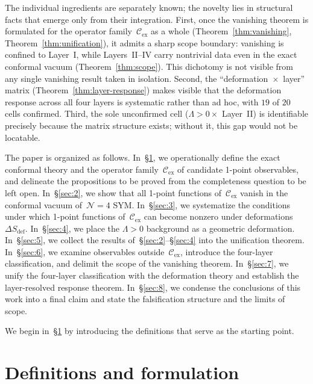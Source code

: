 \documentclass[
  aps,
  prd,
  preprint,
  groupedaddress,
  nofootinbib,
  longbibliography
]{revtex4-2}
\theoremstyle{remark}
\newcommand{\Cex}{\mathcal{C}_{\mathrm{ex}}}
\newcommand{\N}{\mathcal{N}}
\begin{document}
The individual ingredients are separately known;
the novelty lies in structural facts that emerge only from their
integration.
First, once the vanishing theorem is formulated for the operator
family~$\Cex$ as a whole
(Theorem~\ref{thm:vanishing}, Theorem~\ref{thm:unification}),
it admits a sharp scope boundary:
vanishing is confined to Layer~I, while Layers~II--IV carry
nontrivial data even in the exact conformal vacuum
(Theorem~\ref{thm:scope}).
This dichotomy is not visible from any single vanishing result
taken in isolation.
Second, the ``deformation~$\times$~layer'' matrix
(Theorem~\ref{thm:layer-response}) makes visible that the
deformation response across all four layers is systematic
rather than ad hoc, with $19$ of $20$ cells confirmed.
Third, the sole unconfirmed cell
($\Lambda>0 \times$ Layer~II) is identifiable precisely because
the matrix structure exists;
without it, this gap would not be locatable.

\bigskip

The paper is organized as follows.
In~\S\ref{sec:1}, we operationally define the exact conformal
theory and the operator family~$\Cex$ of candidate 1-point
observables, and delineate the propositions to be proved from
the completeness question to be left open.
In~\S\ref{sec:2}, we show that all 1-point functions of~$\Cex$
vanish in the conformal vacuum of~$\N=4$ SYM.
In~\S\ref{sec:3}, we systematize the conditions under which
1-point functions of~$\Cex$ can become nonzero under
deformations~$\Delta S_{\mathrm{def}}$.
In~\S\ref{sec:4}, we place the $\Lambda>0$ background as a
geometric deformation.
In~\S\ref{sec:5}, we collect the results of~\S\ref{sec:2}--\S\ref{sec:4}
into the unification theorem.
In~\S\ref{sec:6}, we examine observables outside~$\Cex$,
introduce the four-layer classification, and delimit the scope
of the vanishing theorem.
In~\S\ref{sec:7}, we unify the four-layer classification with
the deformation theory and establish the layer-resolved response
theorem.
In~\S\ref{sec:8}, we condense the conclusions of this work into
a final claim and state the falsification structure and the limits
of scope.

We begin in~\S\ref{sec:1} by introducing the definitions that
serve as the starting point.

\section{Definitions and formulation}\label{sec:1}
\end{document}

